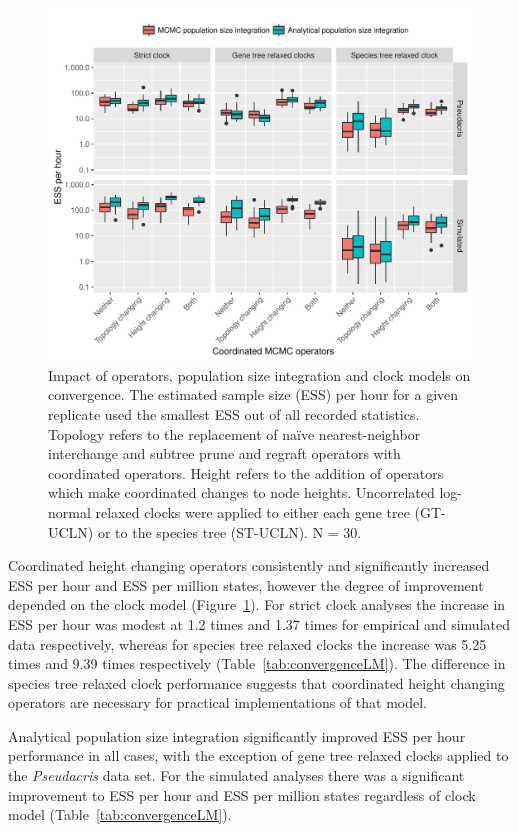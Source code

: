 \documentclass[nogrid]{MBE}%
\begin{document}
\begin{figure}[htb!]
\centering
\includegraphics[width=\textwidth]{minimum_ess_per_hour_starbeast2.pdf}
\caption
{Impact of operators, population size integration and clock models on
convergence. The estimated sample size (ESS) per hour for a given replicate
used the smallest ESS out of all recorded statistics. Topology refers to the
replacement of na\"ive nearest-neighbor interchange and subtree prune and
regraft operators with coordinated operators. Height refers to the addition of
operators which make coordinated changes to node heights. Uncorrelated log-
normal relaxed clocks were applied to either each gene tree (GT-UCLN) or to
the species tree (ST-UCLN). N = 30.}
\label{fig:realEssPerHour}
\end{figure}

Coordinated height changing operators consistently and significantly
increased ESS per hour and ESS per million states, however the degree of
improvement depended on the clock model (Figure~\ref{fig:realEssPerHour}). For
strict clock analyses the increase in ESS per hour was modest at 1.2 times and
1.37 times for empirical and simulated data respectively, whereas for species
tree relaxed clocks the increase was 5.25 times and 9.39 times respectively
(Table~\ref{tab:convergenceLM}). The difference in species tree relaxed clock
performance suggests that coordinated height changing operators are necessary
for practical implementations of that model.

Analytical population size integration significantly improved ESS per hour
performance in all cases, with the exception of gene tree relaxed clocks
applied to the \textit{Pseudacris} data set. For the simulated analyses there
was a significant improvement to ESS per hour and ESS per million states
regardless of clock model (Table~\ref{tab:convergenceLM}).
\end{document}
